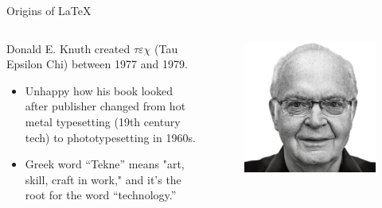 \documentclass[aspectratio=169]{beamer}
\begin{document}
\begin{frame}{Origins of \LaTeX}
    \begin{columns}
    \small
    \begin{column}{0.8\textwidth}
        Donald E. Knuth created $\tau \varepsilon \chi$ (Tau Epsilon Chi) between 1977 and 1979.
        \begin{itemize}
            \item Unhappy how his book looked after publisher changed from hot metal typesetting (19th century tech) to phototypesetting in 1960s.
            \item Greek word ``Tekne'' means "art, skill, craft in work," and it's the root for the word ``technology.''
        \end{itemize}
    \end{column}
            
    \begin{column}{0.2\textwidth}
        \begin{figure}
        \centering
            \includegraphics[scale=0.06]{images/donald-knuth.jpg}
        \end{figure}
    \end{column}
    \normalsize                
    \end{columns}

    \begin{columns}
        \begin{column}{0.7\textwidth}
        \end{column}
        \begin{column}{0.3\textwidth}
        \end{column}
    \end{columns}


\end{frame}
\end{document}

